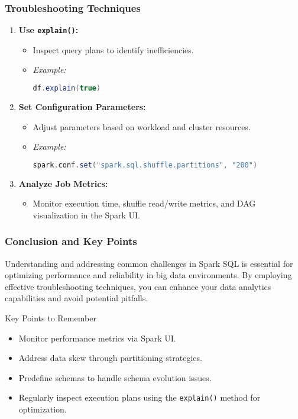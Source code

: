\documentclass[aspectratio=169]{beamer}
\begin{document}
\begin{frame}[fragile]
    \frametitle{Troubleshooting Techniques}
    \begin{enumerate}
        \item \textbf{Use \texttt{explain()}:}
        \begin{itemize}
            \item Inspect query plans to identify inefficiencies.
            \item \textit{Example:}
            \begin{lstlisting}[language=scala]
df.explain(true)
            \end{lstlisting}
        \end{itemize}
        
        \item \textbf{Set Configuration Parameters:}
        \begin{itemize}
            \item Adjust parameters based on workload and cluster resources.
            \item \textit{Example:}
            \begin{lstlisting}[language=scala]
spark.conf.set("spark.sql.shuffle.partitions", "200")
            \end{lstlisting}
        \end{itemize}
        
        \item \textbf{Analyze Job Metrics:}
        \begin{itemize}
            \item Monitor execution time, shuffle read/write metrics, and DAG visualization in the Spark UI.
        \end{itemize}
    \end{enumerate}
\end{frame}

\begin{frame}[fragile]
    \frametitle{Conclusion and Key Points}
    Understanding and addressing common challenges in Spark SQL is essential for optimizing performance and reliability in big data environments. By employing effective troubleshooting techniques, you can enhance your data analytics capabilities and avoid potential pitfalls.

    \begin{block}{Key Points to Remember}
        \begin{itemize}
            \item Monitor performance metrics via Spark UI.
            \item Address data skew through partitioning strategies.
            \item Predefine schemas to handle schema evolution issues.
            \item Regularly inspect execution plans using the \texttt{explain()} method for optimization.
        \end{itemize}
    \end{block}
\end{frame}
\end{document}
